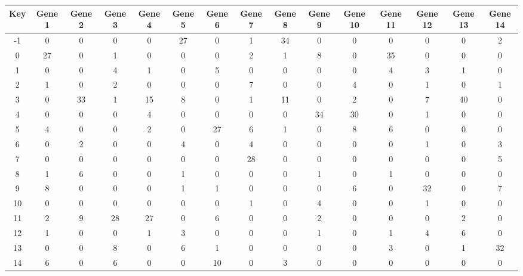 \begin{tabular}{|c|c|c|c|c|c|c|c|c|c|c|c|c|c|c|}
\hline
Key & Gene 1 & Gene 2 & Gene 3 & Gene 4 & Gene 5 & Gene 6 & Gene 7 & Gene 8 & Gene 9 & Gene 10 & Gene 11 & Gene 12 & Gene 13 & Gene 14 \\
\hline
-1 & 0 & 0 & 0 & 0 & 27 & 0 & 1 & 34 & 0 & 0 & 0 & 0 & 0 & 2 \\
0 & 27 & 0 & 1 & 0 & 0 & 0 & 2 & 1 & 8 & 0 & 35 & 0 & 0 & 0 \\
1 & 0 & 0 & 4 & 1 & 0 & 5 & 0 & 0 & 0 & 0 & 4 & 3 & 1 & 0 \\
2 & 1 & 0 & 2 & 0 & 0 & 0 & 7 & 0 & 0 & 4 & 0 & 1 & 0 & 1 \\
3 & 0 & 33 & 1 & 15 & 8 & 0 & 1 & 11 & 0 & 2 & 0 & 7 & 40 & 0 \\
4 & 0 & 0 & 0 & 4 & 0 & 0 & 0 & 0 & 34 & 30 & 0 & 1 & 0 & 0 \\
5 & 4 & 0 & 0 & 2 & 0 & 27 & 6 & 1 & 0 & 8 & 6 & 0 & 0 & 0 \\
6 & 0 & 2 & 0 & 0 & 4 & 0 & 4 & 0 & 0 & 0 & 0 & 1 & 0 & 3 \\
7 & 0 & 0 & 0 & 0 & 0 & 0 & 28 & 0 & 0 & 0 & 0 & 0 & 0 & 5 \\
8 & 1 & 6 & 0 & 0 & 1 & 0 & 0 & 0 & 1 & 0 & 1 & 0 & 0 & 0 \\
9 & 8 & 0 & 0 & 0 & 1 & 1 & 0 & 0 & 0 & 6 & 0 & 32 & 0 & 7 \\
10 & 0 & 0 & 0 & 0 & 0 & 0 & 1 & 0 & 4 & 0 & 0 & 1 & 0 & 0 \\
11 & 2 & 9 & 28 & 27 & 0 & 6 & 0 & 0 & 2 & 0 & 0 & 0 & 2 & 0 \\
12 & 1 & 0 & 0 & 1 & 3 & 0 & 0 & 0 & 1 & 0 & 1 & 4 & 6 & 0 \\
13 & 0 & 0 & 8 & 0 & 6 & 1 & 0 & 0 & 0 & 0 & 3 & 0 & 1 & 32 \\
14 & 6 & 0 & 6 & 0 & 0 & 10 & 0 & 3 & 0 & 0 & 0 & 0 & 0 & 0 \\
\hline
\end{tabular}